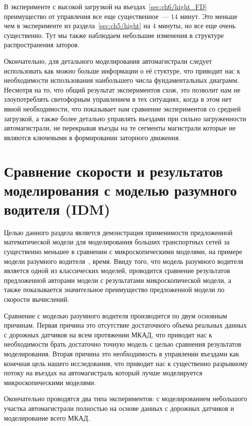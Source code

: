 В эксперименте с высокой загрузкой на въездах~\ref{sec:ch6/hight_FD} преимущество от управления все еще существенное~--- \(14\) минут.
Это меньше чем в эксперименте из раздела~\ref{sec:ch5/hight} на \(4\) минуты, но все еще очень существенно.
Тут мы также наблюдаем небольшие изменения в структуре распространения заторов.

Окончательно, для детального моделирования автомагистрали следует использовать как можно больше информации о её стуктуре, что приводит нас к необходимости использования наибольшего числа фундаментальных диаграмм.
Несмотря на то, что общий результат экспериментов схож, это позволит нам не злоупотреблять светофорным управлением в тех ситуациях, когда в этом нет явной необходимости, что показывает нам сравнение экспериментов со средней загрузкой,
а также более детально управлять въездами при сильно загруженности автомагистрали, не перекрывая въезды на те сегменты магистрали которые не являются ключевыми в формировании заторного движения.


\chapter{Сравнение скорости и результатов моделирования с моделью разумного водителя (IDM)}\label{sec:ch7}
Целью данного раздела является демонстрация применимости предложенной математической модели для моделирования больших транспортных сетей за существенно меньшее в сравнении с микроскопическими моделями, на примере модели разумного водителя~\cite{treiber2000congested}, время.
Ввиду того, что модель разумного водителя является одной из классических моделей, проводится сравнение результатов предложенной авторами модели с результатами микроскопической модели, а также показывается значительное преимущество предложенной модели по скорости вычислений.

Сравнение с моделью разумного водителя производится по двум основным причинам.
Первая причина это отсутствие достаточного объема реальных данных с дорожных датчиков на всем протяжении МКАД, что приводит нас к необходимости брать достаточно точную модель с целью сравнения результатов моделирования.
Вторая причина это необходимость в управлении въездами как конечная цель нашего исследования, что приводит нас к существенно разрывному потоку на въездах на автомагистраль который лучше моделируется микроскопическими моделями.

Окончательно проводятся два типа экспериментов: с моделированием небольшого участка автомагистрали полностью на основе данных с дорожных датчиков и моделирование всего МКАД.

